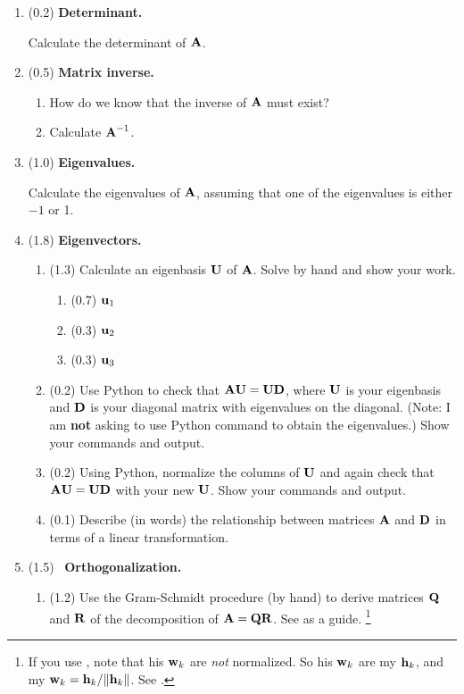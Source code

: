 \begin{enumerate}
\item (0.2) {\bf Determinant.}

Calculate the determinant of $\mbox{${\bf A}$}$.

\item (0.5) {\bf Matrix inverse.}

\begin{enumerate}
\item How do we know that the inverse of $\mbox{${\bf A}$}$ must exist?
\item Calculate $\mbox{${\bf A}$}^{-1}$.
\end{enumerate}

\item (1.0) {\bf Eigenvalues.}

Calculate the eigenvalues of $\mbox{${\bf A}$}$, assuming that one of the eigenvalues is either $-1$ or 1.

\item (1.8) {\bf Eigenvectors.}

\begin{enumerate}
\item (1.3) Calculate an eigenbasis $\mbox{${\bf U}$}$ of $\mbox{${\bf A}$}$. Solve by hand and show your work.
%
\begin{enumerate}
\item (0.7) $\mbox{${\bf u}$}_1$
\item (0.3) $\mbox{${\bf u}$}_2$
\item (0.3) $\mbox{${\bf u}$}_3$
\end{enumerate}

\item (0.2) Use Python to check that $\mbox{${\bf A}$}\mbox{${\bf U}$} = \mbox{${\bf U}$}\mbox{${\bf D}$}$, where $\mbox{${\bf U}$}$ is your eigenbasis and $\mbox{${\bf D}$}$ is your diagonal matrix with eigenvalues on the diagonal. (Note: I am {\bf not} asking to use Python command to obtain the eigenvalues.) Show your commands and output.

\item (0.2) Using Python, normalize the columns of $\mbox{${\bf U}$}$ and again check that $\mbox{${\bf A}$}\mbox{${\bf U}$} = \mbox{${\bf U}$}\mbox{${\bf D}$}$ with your new $\mbox{${\bf U}$}$. Show your commands and output.

\item (0.1) Describe (in words) the relationship between matrices $\mbox{${\bf A}$}$ and $\mbox{${\bf D}$}$ in terms of a linear transformation.

\end{enumerate}

\item (1.5) \ptag\ {\bf Orthogonalization.}

\begin{enumerate}
\item (1.2) Use the Gram-Schmidt procedure (by hand) to derive matrices $\mbox{${\bf Q}$}$ and $\mbox{${\bf R}$}$ of the decomposition of $\mbox{${\bf A}$} = \mbox{${\bf Q}$}\mbox{${\bf R}$}$. See  as a guide.
\footnote{If you use \citet[][p.~326]{Aster}, note that his $\mbox{${\bf w}$}_k$ are {\em not} normalized. So his $\mbox{${\bf w}$}_k$ are my $\mbox{${\bf h}$}_k$, and my $\mbox{${\bf w}$}_k = \mbox{${\bf h}$}_k/\|\mbox{${\bf h}$}_k\|$. See .}


\end{enumerate}
\end{enumerate}
